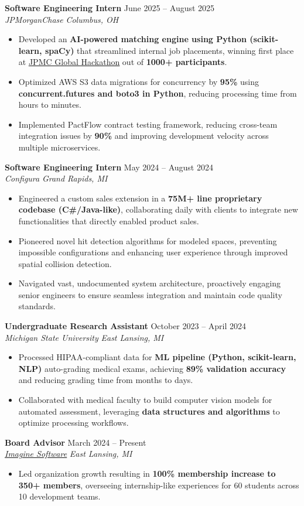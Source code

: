 \documentclass[letterpaper,11pt]{article}
\newcommand{\resumeItem}[1]{
  \item\small{
    {#1 \vspace{-2pt}}
  }
}
\newcommand{\resumeSubheading}[4]{
  \vspace{-2pt}\item
  \textbf{#1} \hfill #2 \\
  \textit{\small#3} \hfill \textit{\small #4} \\
  \vspace{-7pt} %
}
\newcommand{\resumeItemListStart}{\begin{itemize}}
\newcommand{\resumeItemListEnd}{\end{itemize}\vspace{-5pt}}
\begin{document}
    \resumeSubheading
      {Software Engineering Intern}{June 2025 -- August 2025}
      {JPMorganChase}{Columbus, OH}
    \resumeItemListStart
        \resumeItem{Developed an \textbf{AI-powered matching engine using Python (scikit-learn, spaCy)} that streamlined internal job placements, winning first place at \underline{\href{https://www.linkedin.com/posts/indi-de-silva_at-jpmorganchase-our-internship-program-activity-7355579081490354177-NYLE}{JPMC Global Hackathon}} out of \textbf{1000+ participants}.}
        \resumeItem{Optimized AWS S3 data migrations for concurrency by \textbf{95\%} using \textbf{concurrent.futures and boto3 in Python}, reducing processing time from hours to minutes.}
        \resumeItem{Implemented PactFlow contract testing framework, reducing cross-team integration issues by \textbf{90\%} and improving development velocity across multiple microservices.}
    \resumeItemListEnd

    \resumeSubheading
      {Software Engineering Intern}{May 2024 -- August 2024}
      {Configura}{Grand Rapids, MI}
      \resumeItemListStart
        \resumeItem{Engineered a custom sales extension in a \textbf{75M+ line proprietary codebase (C\#/Java-like)}, collaborating daily with clients to integrate new functionalities that directly enabled product sales.}
        \resumeItem{Pioneered novel hit detection algorithms for modeled spaces, preventing impossible configurations and enhancing user experience through improved spatial collision detection.}
        \resumeItem{Navigated vast, undocumented system architecture, proactively engaging senior engineers to ensure seamless integration and maintain code quality standards.}
      \resumeItemListEnd

\resumeSubheading
      {Undergraduate Research Assistant}{October 2023 -- April 2024}
      {Michigan State University}{East Lansing, MI}
      \resumeItemListStart
        \resumeItem{Processed HIPAA-compliant data for \textbf{ML pipeline (Python, scikit-learn, NLP)} auto-grading medical exams, achieving \textbf{89\% validation accuracy} and reducing grading time from months to days.}
        \resumeItem{Collaborated with medical faculty to build computer vision models for automated assessment, leveraging \textbf{data structures and algorithms} to optimize processing workflows.}
      \resumeItemListEnd

      \resumeSubheading
      {Board Advisor}{March 2024 -- Present}
      {\underline{\href{https://www.imagine-software.org/}{Imagine Software}}}{East Lansing, MI}
      \resumeItemListStart
        \resumeItem{Led organization growth resulting in \textbf{100\% membership increase to 350+ members}, overseeing internship-like experiences for 60 students across 10 development teams.}
      \resumeItemListEnd
\end{document}
